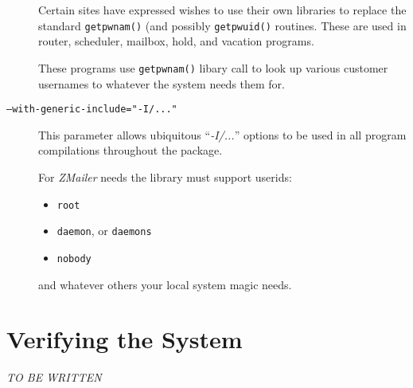 \begin{description}
Certain sites have expressed wishes to use their own libraries
to replace the standard {\tt getpwnam()} (and possibly {\tt getpwuid()}
routines.
These are used in router, scheduler, mailbox, hold, and vacation
programs.

These programs use {\tt getpwnam()} libary call to look up
various customer usernames to whatever the system needs them
for.

\item[\tt --with-generic-include="-I/..."] \mbox{}

This parameter allows ubiquitous ``{\em -I/...}'' options to be used
in all program compilations throughout the package.


For {\em ZMailer} needs the library must support userids:
\begin{itemize}
\item {\tt root}
\item {\tt daemon}, or {\tt daemons}
\item {\tt nobody}
\end{itemize}
and whatever others your local system magic needs.
\end{description}

\section{Verifying the System}

{\em\large TO BE WRITTEN}


